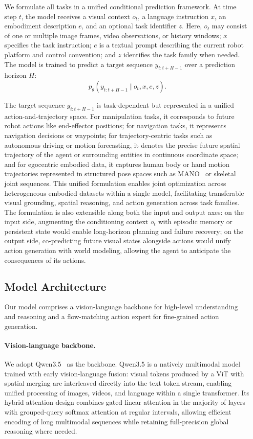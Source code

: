 \documentclass{article}
\begin{document}
We formulate all tasks in a unified conditional prediction framework. At time step $t$, the model receives a visual context $o_{t}$, a language instruction $x$, an embodiment description $e$, and an optional task identifier $z$. Here, $o_{t}$ may consist of one or multiple image frames, video observations, or history windows; $x$ specifies the task instruction; $e$ is a textual prompt describing the current robot platform and control convention; and $z$ identifies the task family when needed. The model is trained to predict a target sequence $y_{t:t+H-1}$ over a prediction horizon $H$:
\[
p_\theta(y_{t:t+H-1} \mid o_{t}, x, e, z).
\]

The target sequence $y_{t:t+H-1}$ is task-dependent but represented in a unified action-and-trajectory space. For manipulation tasks, it corresponds to future robot actions like end-effector positions; for navigation tasks, it represents navigation decisions or waypoints; for trajectory-centric tasks such as autonomous driving or motion forecasting, it denotes the precise future spatial trajectory of the agent or surrounding entities in continuous coordinate space; and for egocentric embodied data, it captures human body or hand motion trajectories represented in structured pose spaces such as MANO~\citep{MANO} or skeletal joint sequences. This unified formulation enables joint optimization across heterogeneous embodied datasets within a single model, facilitating transferable visual grounding, spatial reasoning, and action generation across task families. The formulation is also extensible along both the input and output axes: on the input side, augmenting the conditioning context $o_{t}$ with episodic memory or persistent state would enable long-horizon planning and failure recovery; on the output side, co-predicting future visual states alongside actions would unify action generation with world modeling, allowing the agent to anticipate the consequences of its actions. 
\subsection{Model Architecture}
\label{sec:architecture}

Our model comprises a vision-language backbone for high-level understanding and reasoning and a flow-matching action expert for fine-grained action generation.

\paragraph{Vision-language backbone.}
We adopt Qwen3.5~\citep{qwen35blog} as the backbone. Qwen3.5 is a natively multimodal model trained with early vision-language fusion: visual tokens produced by a ViT with spatial merging are interleaved directly into the text token stream, enabling unified processing of images,
videos, and language within a single transformer.
Its hybrid attention design combines gated linear attention in the majority of layers with grouped-query softmax attention at regular intervals, allowing
efficient encoding of long multimodal sequences while retaining full-precision global reasoning where needed.
\end{document}
